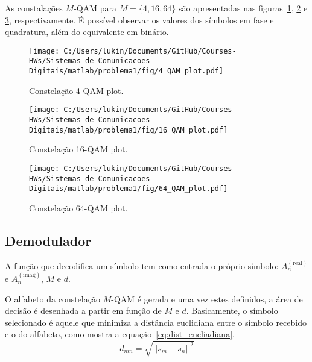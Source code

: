 As constalações $M$-QAM para $M = \{4, 16, 64\}$ são apresentadas nas figuras~\ref{fig:4_QAM_plot}, \ref{fig:16_QAM_plot} e \ref{fig:64_QAM_plot}, respectivamente. É possível observar os valores dos símbolos em fase e quadratura, além do equivalente em binário.

\begin{figure}[!ht]
    \centering
    \texttt{[image: C:/Users/lukin/Documents/GitHub/Courses-HWs/Sistemas de Comunicacoes Digitais/matlab/problema1/fig/4\_QAM\_plot.pdf]}
    \caption{Constelação 4-QAM plot.}
    \label{fig:4_QAM_plot}
\end{figure}

\clearpage

\begin{figure}[!ht]
    \centering
    \texttt{[image: C:/Users/lukin/Documents/GitHub/Courses-HWs/Sistemas de Comunicacoes Digitais/matlab/problema1/fig/16\_QAM\_plot.pdf]}
    \caption{Constelação 16-QAM plot.}
    \label{fig:16_QAM_plot}
\end{figure}

\begin{figure}[!ht]
    \centering
    \texttt{[image: C:/Users/lukin/Documents/GitHub/Courses-HWs/Sistemas de Comunicacoes Digitais/matlab/problema1/fig/64\_QAM\_plot.pdf]}
    \caption{Constelação 64-QAM plot.}
    \label{fig:64_QAM_plot}
\end{figure}

\clearpage

\subsection{Demodulador}

A função que decodifica um símbolo tem como entrada o próprio símbolo: $A_n^{(\text{real})}$ e $A_n^{(\text{imag})}$, $M$ e $d$. 

O alfabeto da constelação $M$-QAM é gerada e uma vez estes definidos, a área de decisão é desenhada a partir em função de $M$ e $d$. Basicamente, o símbolo selecionado é aquele que minimiza a distância euclidiana entre o símbolo recebido e o do alfabeto, como mostra a equação~\ref{eq:dist_eucliadiana}.
\begin{equation}
    d_{mn} = \sqrt{|| s_m - s_n||^2}
    \label{eq:dist_eucliadiana}
\end{equation}

